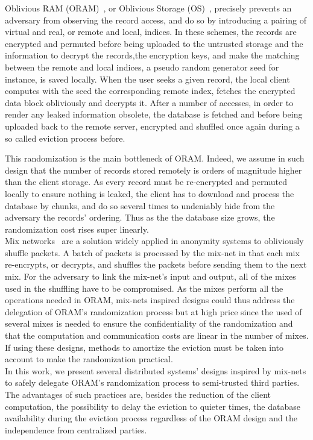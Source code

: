 \documentclass[USenglish,oneside,twocolumn]{article}
\begin{document}
Oblivious RAM (ORAM)~\cite{goldreich87}, or Oblivious Storage (OS)~\cite{boneh2011}, precisely prevents an adversary from observing the record access, and do so by introducing a pairing of virtual and real, or remote and local, indices. In these schemes, the records are encrypted and permuted before being uploaded to the untrusted storage and the information to decrypt the records,the encryption keys, and make the matching between the remote and local indices, a pseudo random generator seed for instance, is saved locally. When the user seeks a given record, the local client computes with the seed the corresponding remote index, fetches the encrypted data block obliviously and decrypts it. After a number of accesses, in order to render any leaked information obsolete, the database is fetched and before being uploaded back to the remote server, encrypted and shuffled once again during a so called eviction process before.

This randomization is the main bottleneck of ORAM. Indeed, we assume in such design that the number of records stored remotely is orders of magnitude higher than the client storage. As every record must be re-encrypted and permuted locally to ensure nothing is leaked, the client has to download and process the database by chunks, and do so several times to undeniably hide from the adversary the records' ordering. Thus as the the database size grows, the randomization cost rises super linearly.\\

Mix networks~\cite{chaum1981untraceable} are a solution widely applied in anonymity systems to obliviously shuffle packets. A batch of packets is processed by the mix-net in that each mix re-encrypts, or decrypts, and shuffles the packets before sending them to the next mix. For the adversary to link the mix-net's input and output, all of the mixes used in the shuffling have to be compromised.
As the mixes perform all the operations needed in ORAM, mix-nets inspired designs could thus address the delegation of ORAM's randomization process but at high price since the used of several mixes is needed to ensure the confidentiality of the randomization and that the computation and communication costs are linear in the number of mixes. If using these designs, methods to amortize the eviction must be taken into account to make the randomization practical.\\

In this work, we present several distributed systems' designs inspired by mix-nets to safely delegate ORAM's randomization process to semi-trusted third parties.
The advantages of such practices are, besides the reduction of the client computation, the possibility to delay the eviction to quieter times, the database availability during the eviction process regardless of the ORAM design and the independence from centralized parties.
\end{document}
